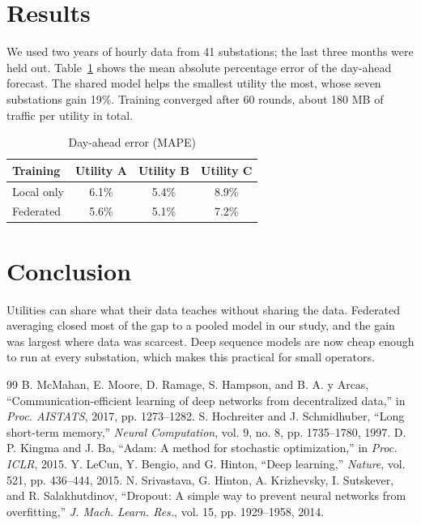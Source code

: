 \documentclass[conference]{IEEEtran}
\begin{document}
\section{Results}
We used two years of hourly data from 41 substations; the last three months were held out. Table~\ref{t2} shows the
mean absolute percentage error of the day-ahead forecast. The shared model helps the smallest utility the most, whose
seven substations gain 19\%. Training converged after 60 rounds, about 180 MB of traffic per utility in total.

\begin{table}[t]
\caption{Day-ahead error (MAPE)\label{t2}}
\centering
\begin{tabular}{lccc}
\hline
Training & Utility A & Utility B & Utility C \\
\hline
Local only & 6.1\% & 5.4\% & 8.9\% \\
Federated & 5.6\% & 5.1\% & 7.2\% \\
\hline
\end{tabular}
\end{table}

\section{Conclusion}
Utilities can share what their data teaches without sharing the data. Federated averaging closed most of the gap to a
pooled model in our study, and the gain was largest where data was scarcest. Deep sequence models \cite{lecun} are now
cheap enough to run at every substation, which makes this practical for small operators.

\begin{thebibliography}{99}
 B. McMahan, E. Moore, D. Ramage, S. Hampson, and B. A. y Arcas, ``Communication-efficient learning of deep networks from decentralized data,'' in \emph{Proc. AISTATS}, 2017, pp. 1273--1282.
 S. Hochreiter and J. Schmidhuber, ``Long short-term memory,'' \emph{Neural Computation}, vol. 9, no. 8, pp. 1735--1780, 1997.
 D. P. Kingma and J. Ba, ``Adam: A method for stochastic optimization,'' in \emph{Proc. ICLR}, 2015.
 Y. LeCun, Y. Bengio, and G. Hinton, ``Deep learning,'' \emph{Nature}, vol. 521, pp. 436--444, 2015.
 N. Srivastava, G. Hinton, A. Krizhevsky, I. Sutskever, and R. Salakhutdinov, ``Dropout: A simple way to prevent neural networks from overfitting,'' \emph{J. Mach. Learn. Res.}, vol. 15, pp. 1929--1958, 2014.
\end{thebibliography}
\end{document}
